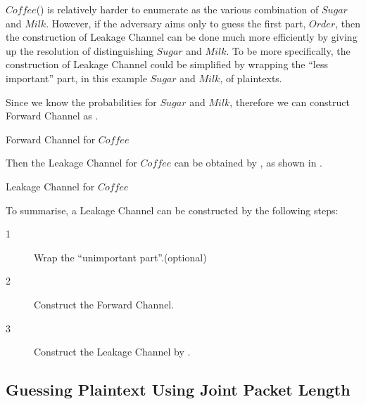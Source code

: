 \begin{example} \label{Ex: Single-OrderFlavour}
$Coffee$() is relatively harder to enumerate as the various combination of $Sugar$ and $Milk$. However, if the adversary aims only to guess the first part, $Order$, then the construction of Leakage Channel can be done much more efficiently by giving up the resolution of distinguishing $Sugar$ and $Milk$. To be more specifically, the construction of Leakage Channel could be simplified by wrapping the “less important” part, in this example $Sugar$ and $Milk$, of plaintexts.

Since we know the probabilities for $Sugar$ and $Milk$, therefore we can construct Forward Channel as .

\begin{table}[H]
\centering
\resizebox{\textwidth}{!}{
{}
}
\caption{Forward Channel for $Coffee$}
\label{Tbl: Forward Channel for Coffee}
\end{table}

Then the Leakage Channel for $Coffee$ can be obtained by , as shown in .
\begin{table}[H]
\centering
{}
\caption{Leakage Channel for $Coffee$}
\label{Tbl: Leakage Channel for Coffee}
\end{table}
\end{example}

To summarise, a Leakage Channel can be constructed by the following steps:
\begin{description}
\item[1] Wrap the “unimportant part”.(optional)
\item[2] Construct the Forward Channel.
\item[3] Construct the Leakage Channel by .
\end{description}

\subsection{Guessing Plaintext Using Joint Packet Length} \label{Sec: Guessing Plaintext Using Joint Packet Length}



